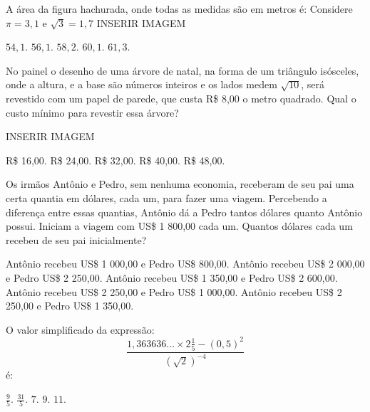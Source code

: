 \begin{question}%
A área da figura hachurada, onde todas as medidas são em metros é: Considere \(\pi = 3,1\) e \(\sqrt{3} = 1,7\)
INSERIR IMAGEM
    \begin{tasks}
        \task \(54,1\).
        \task \(56,1\).
        \task \(58,2\).
        \task \(60,1\).
        \task \(61,3\).
    \end{tasks}
\end{question}

\begin{question}%
No painel o desenho de uma árvore de natal, na forma de um triângulo isósceles, onde a altura, e a base são números inteiros e os lados medem \(\sqrt{10}\), será revestido com um papel de parede, que custa R\$ 8,00 o metro quadrado. Qual o custo mínimo para revestir essa árvore?

INSERIR IMAGEM
    \begin{tasks}
        \task R\$ 16,00.
        \task R\$ 24,00.
        \task R\$ 32,00.
        \task R\$ 40,00.
        \task R\$ 48,00.
    \end{tasks}
\end{question}

\begin{question}%
Os irmãos Antônio e Pedro, sem nenhuma economia, receberam de seu pai uma certa quantia em dólares, cada um, para fazer uma viagem. Percebendo a diferença entre essas quantias, Antônio dá a Pedro tantos dólares quanto Antônio possui. Iniciam a viagem com US\$ 1 800,00 cada um. Quantos dólares cada um recebeu de seu pai inicialmente?
    \begin{tasks}
        \task Antônio recebeu US\$ 1 000,00 e Pedro US\$ 800,00.
        \task Antônio recebeu US\$ 2 000,00 e Pedro US\$ 2 250,00.
        \task Antônio recebeu US\$ 1 350,00 e Pedro US\$ 2 600,00.
        \task Antônio recebeu US\$ 2 250,00 e Pedro US\$ 1 000,00.
        \task Antônio recebeu US\$ 2 250,00 e Pedro US\$ 1 350,00.
    \end{tasks}
\end{question}

\begin{question}%
O valor simplificado da expressão:
\[ \frac{1,363636 \ldots \times 2 \frac{1}{5} - (0,5)^2}{(\sqrt{2})^{-4}}\] é:
    \begin{tasks}
        \task \(\frac{9}{5}\).
        \task \(\frac{31}{5}\).
        \task \(7\).
        \task \(9\).
        \task \(11\).
    \end{tasks}
\end{question}

